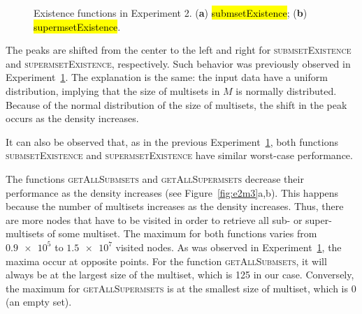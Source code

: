 \documentclass[algorithms,article,accept,pdftex,moreauthors]{Definitions/mdpi}
\begin{document}
\begin{figure}[H]
\caption{Existence functions in Experiment 2. (\textbf{a}) \hl{submsetExistence}; (\textbf{b}) \hl{supermsetExistence}.\label{fig:e2m1}}
\end{figure}

The peaks are shifted from the center to the left and right for 
\textsc{submsetExistence} and \textsc{supermsetExistence}, respectively. Such 
behavior was previously observed in Experiment~\hyperref[s:exp1]{1}. The 
explanation is the same: the input data have a uniform distribution, implying that 
the size of multisets in $M$ is normally distributed. Because of the normal 
distribution of the size of multisets, the shift in the peak occurs as the density increases.

It can also be observed that, as in the previous Experiment~\hyperref[s:exp1]{1}, both 
functions \textsc{submsetExistence} and \textsc{supermsetExistence} have similar 
worst-case performance. 

The functions \textsc{getAllSubmsets} and \textsc{getAllSupermsets} decrease 
their performance as the density increases (see Figure~\ref{fig:e2m3}a,b). This happens because the number of multisets increases as 
the density increases. Thus, there are more nodes that have to be visited in order to 
retrieve all sub- or super-multisets of some multiset. The maximum for both functions 
varies from $\num{0.9e5}$ to $\num{1.5e7}$ visited nodes. As was observed in 
Experiment~\hyperref[s:exp1]{1}, the maxima occur at opposite points. For the 
function \textsc{getAllSubmsets}, it will always be at the largest size of the multiset, 
which is 125 in our case. Conversely, the maximum for \textsc{getAllSupermsets} 
is at the smallest size of multiset, which is 0 (an empty set).
\end{document}
